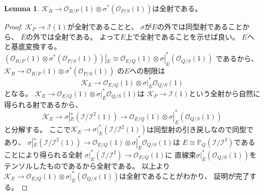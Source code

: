 \documentclass[uplatex]{jsarticle}
\theoremstyle{definition}
\newtheorem{lem}[lem]{Lemma}
\renewcommand{\P}{\mathbb{P}}
\newcommand{\mcI}{\mathcal{I}}
\newcommand{\mcK}{\mathcal{K}}
\newcommand{\mcO}{\mathcal{O}}
\newcommand{\OOO}{\mcO}
\newcommand{\OO}[1]{\OOO_{#1}}
\begin{document}
\begin{lem}
  \(\mcK_B\to \OO{B/P}(1)\otimes \sigma^*(\OO{P/S}(1))\)は全射である。
\end{lem}

\begin{proof}
  \(\mcK_P\to \mcI(1)\)が全射であることと、
  \(\sigma\)が\(E\)の外では同型射であることから、
  \(E\)の外では全射である。
  よって\(E\)上で全射であることを示せば良い。
  \(E\)へと基底変換する。
  \((\OO{B/P}(1) \otimes \sigma^*(\OO{P/S}(1)))|_E
  \cong \OO{E/Q}(1) \otimes \sigma|_E^*(\OO{Q/S}(1))\)
  であるから、
  \(\mcK_B\to \OO{B/P}(1)\otimes \sigma^*(\OO{P/S}(1))\)
  の\(E\)への制限は
  \[
  \mcK_E\to \OO{E/Q}(1) \otimes \sigma|_E^*\OO{Q/S}(1)
  \]
  となる。
  \(\mcK_E\to \OO{E/Q}(1) \otimes \sigma|_E^*\OO{Q/S}(1)\)は
  \(\mcK_P\to \mcI(1)\)という全射から自然に得られる射であるから、
  \[
  \mcK_E \to \sigma|_E^*(\mcI/\mcI^2(1)) \to
  \OO{E/Q}(1) \otimes \sigma|_E^*(\OO{Q/S}(1))
  \]
  と分解する。
  ここで\(\mcK_E \to \sigma|_E^*(\mcI/\mcI^2(1))\)は同型射の引き戻しなので同型であり、
  \(\sigma|_E^*(\mcI/\mcI^2(1)) \to
  \OO{E/Q}(1) \otimes \sigma|_E^*\OO{Q/S}(1)\)は
  \(E\cong \P_Q(\mcI/\mcI^2)\)であることにより得られる全射
  \(\sigma|_E^*(\mcI/\mcI^2)\to \OO{E/Q}(1)\)に
  直線束\(\sigma|_E^*(\OO{Q/S}(1))\)をテンソルしたものであるから全射である。
  以上より\(\mcK_E\to \OO{E/Q}(1) \otimes \sigma|_E^*(\OO{Q/S}(1))\)は全射であることがわかり、
  証明が完了する。
\end{proof}
\end{document}
